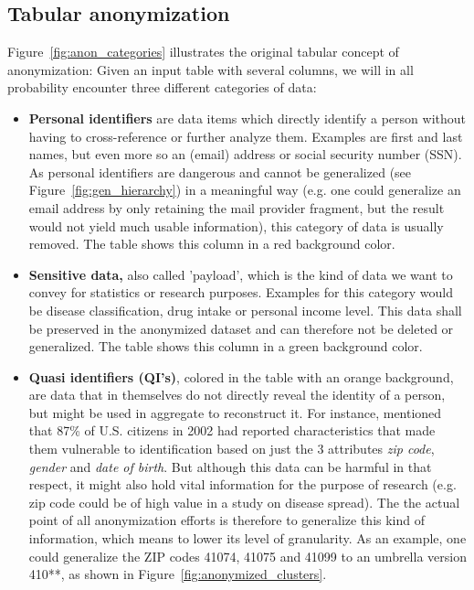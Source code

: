 \documentclass{llncs}
\begin{document}
\subsection{Tabular anonymization}
\label{ssect:tab_anonym}

Figure~\ref{fig:anon_categories} illustrates the original tabular concept of anonymization: Given an input table with several columns, we will in all probability encounter three different categories of data:

\begin{itemize}
	\item \textbf{Personal identifiers} are data items which directly identify a person without having to cross-reference or further analyze them. Examples are first and last names, but even more so an (email) address or social security number (SSN). As personal identifiers are dangerous and cannot be generalized (see Figure~\ref{fig:gen_hierarchy}) in a meaningful way (e.g. one could generalize an email address by only retaining the mail provider fragment, but the result would not yield much usable information), this category of data is usually removed. The table shows this column in a red background color.
	\item \textbf{Sensitive data,} also called 'payload', which is the kind of data we want to convey for statistics or research purposes. Examples for this category would be disease classification, drug intake or personal income level. This data shall be preserved in the anonymized dataset and can therefore not be deleted or generalized. The table shows this column in a green background color.
	\item \textbf{Quasi identifiers (QI's)}, colored in the table with an orange background, are data that in themselves do not directly reveal the identity of a person, but might be used in aggregate to reconstruct it. For instance, \cite{sweeney2002k} mentioned that 87\% of U.S. citizens in 2002 had reported characteristics that made them vulnerable to identification based on just the 3 attributes \textit{zip code}, \textit{gender} and \textit{date of birth}. But although this data can be harmful in that respect, it might also hold vital information for the purpose of research (e.g. zip code could be of high value in a study on disease spread). The the actual point of all anonymization efforts is therefore to generalize this kind of information, which means to lower its level of granularity. As an example, one could generalize the ZIP codes 41074, 41075 and 41099 to an umbrella version 410**, as shown in Figure~\ref{fig:anonymized_clusters}.
\end{itemize}
\end{document}
